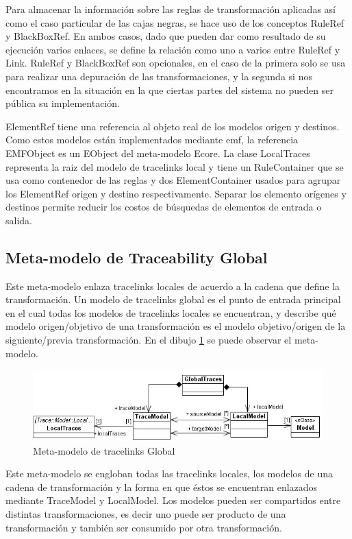 \documentclass[a4paper,12pt,oneside,spanish]{book}
\begin{document}
Para almacenar la información sobre las reglas de transformación aplicadas así como el caso particular de las cajas negras, se hace uso de los conceptos RuleRef y BlackBoxRef. En ambos casos, dado que pueden dar como resultado de su ejecución varios enlaces, se define la relación como uno a varios entre RuleRef y Link. RuleRef y BlackBoxRef son opcionales, en el caso de la primera solo se usa para realizar una depuración de las transformaciones, y la segunda si nos encontramos en la situación en la que ciertas partes del sistema no pueden ser pública su implementación.

ElementRef tiene una referencia al objeto real de los modelos origen y destinos. Como estos modelos están implementados mediante \gls{emf}, la referencia EMFObject es un EObject del meta-modelo Ecore. La clase LocalTraces representa la raiz del modelo de tracelinks local y tiene un RuleContainer que se usa como contenedor de las reglas y dos ElementContainer usados para agrupar los ElementRef origen y destino respectivamente. Separar los elemento orígenes y destinos permite reducir los costos de búsquedas de elementos de entrada o salida.

\subsection{Meta-modelo de Traceability Global}

Este meta-modelo enlaza tracelinks locales de acuerdo a la cadena que define la transformación. Un modelo de tracelinks global es el punto de entrada principal en el cual todas los modelos de tracelinks locales se encuentran, y describe qué modelo origen/objetivo de una transformación es el modelo objetivo/origen de la siguiente/previa transformación. En el dibujo \ref{fig:GlobalTraceMetamodel} se puede observar el meta-modelo.

\begin{figure}[hbtp]
\centering
\includegraphics[scale=.6]{./img/GlobalTraceMetamodel}
\caption{Meta-modelo de tracelinks Global}
\label{fig:GlobalTraceMetamodel}
\end{figure}

Este meta-modelo se engloban todas las tracelinks locales, los modelos de una cadena de transformación y la forma en que éstos se encuentran enlazados mediante TraceModel y LocalModel. Los modelos pueden ser compartidos entre distintas transformaciones, es decir uno puede ser producto de una transformación y también ser consumido por otra transformación.
\end{document}
